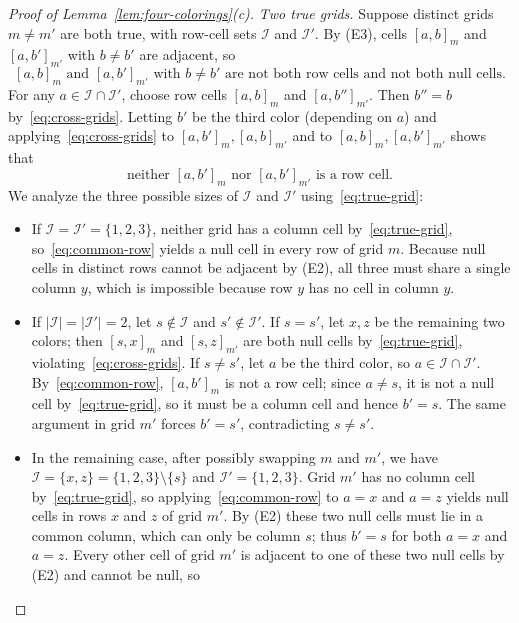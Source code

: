 \begin{proof}[Proof of Lemma~\ref{lem:four-colorings}\textup{(c)}]
\emph{Two true grids.} Suppose distinct grids $m\ne m'$ are both true, with row-cell sets $\mathcal I$ and $\mathcal I'$. By (E3), cells $[a,b]_m$ and $[a,b']_{m'}$ with $b\ne b'$ are adjacent, so
\begin{equation}\label{eq:cross-grids}
\text{$[a,b]_m$ and $[a,b']_{m'}$ with $b\ne b'$ are not both row cells and not both null cells.}
\end{equation}
For any $a\in\mathcal I\cap\mathcal I'$, choose row cells $[a,b]_m$ and $[a,b'']_{m'}$. Then $b''=b$ by~\eqref{eq:cross-grids}. Letting $b'$ be the third color (depending on $a$) and applying~\eqref{eq:cross-grids} to $[a,b']_m,[a,b]_{m'}$ and to $[a,b]_m,[a,b']_{m'}$ shows that
\begin{equation}\label{eq:common-row}
\text{neither $[a,b']_m$ nor $[a,b']_{m'}$ is a row cell.}
\end{equation}
We analyze the three possible sizes of $\mathcal I$ and $\mathcal I'$ using~\eqref{eq:true-grid}:
\begin{itemize}
\item If $\mathcal I=\mathcal I'=\{1,2,3\}$, neither grid has a column cell by~\eqref{eq:true-grid}, so~\eqref{eq:common-row} yields a null cell in every row of grid $m$. Because null cells in distinct rows cannot be adjacent by (E2), all three must share a single column $y$, which is impossible because row $y$ has no cell in column $y$.
\item If $|\mathcal I|=|\mathcal I'|=2$, let $s\notin\mathcal I$ and $s'\notin\mathcal I'$. If $s=s'$, let $x,z$ be the remaining two colors; then $[s,x]_m$ and $[s,z]_{m'}$ are both null cells by~\eqref{eq:true-grid}, violating~\eqref{eq:cross-grids}. If $s\ne s'$, let $a$ be the third color, so $a\in\mathcal I\cap\mathcal I'$. By~\eqref{eq:common-row}, $[a,b']_m$ is not a row cell; since $a\ne s$, it is not a null cell by~\eqref{eq:true-grid}, so it must be a column cell and hence $b'=s$. The same argument in grid $m'$ forces $b'=s'$, contradicting $s\ne s'$.
\item In the remaining case, after possibly swapping $m$ and $m'$, we have $\mathcal I=\{x,z\}=\{1,2,3\}\setminus\{s\}$ and $\mathcal I'=\{1,2,3\}$. Grid $m'$ has no column cell by~\eqref{eq:true-grid}, so applying~\eqref{eq:common-row} to $a=x$ and $a=z$ yields null cells in rows $x$ and $z$ of grid $m'$. By (E2) these two null cells must lie in a common column, which can only be column $s$; thus $b'=s$ for both $a=x$ and $a=z$. Every other cell of grid $m'$ is adjacent to one of these two null cells by (E2) and cannot be null, so

\end{itemize}
\end{proof}

